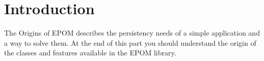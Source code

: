 \documentclass{article}
\begin{document}
\section {Introduction}
The Origins of EPOM describes the persistency needs of a simple application and a way to solve them. At the end of this part you should understand the origin of the classes and features available in the EPOM library.
\end{document}
